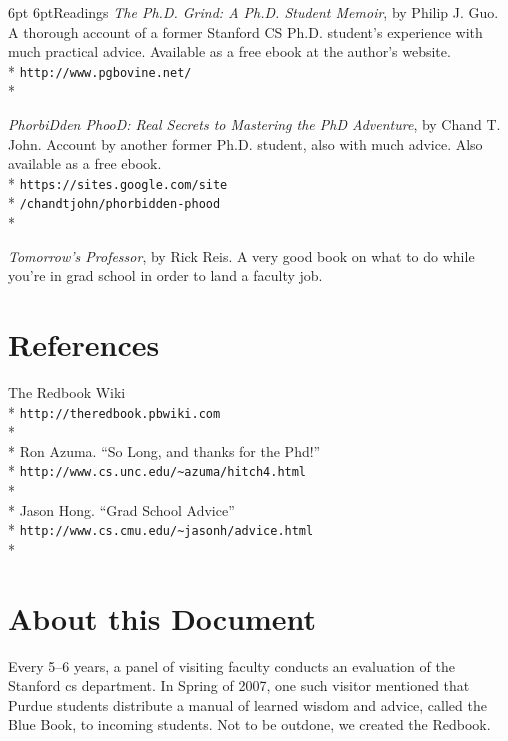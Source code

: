 \documentclass[10pt]{book}
\makeatletter
\renewcommand{\subsection}{\@startsection{subsection}{2}{0mm}%
   {6pt}%
   {6pt}{\normalfont\normalsize\itshape}}
\makeatother
\begin{document}
\subsection{Readings}
{\it The Ph.D. Grind: A Ph.D. Student Memoir}, by Philip J. Guo. A thorough account of a former Stanford CS Ph.D. student's experience with much practical advice. Available as a free ebook at the author's website.\\*
\verb+http://www.pgbovine.net/+\\*

{\it PhorbiDden PhooD: Real Secrets to Mastering the PhD Adventure}, by Chand T. John. Account by another former Ph.D. student, also with much advice. Also available as a free ebook.\\*
\verb+https://sites.google.com/site+\\*
\verb+/chandtjohn/phorbidden-phood+\\*

{\it Tomorrow's Professor}, by Rick Reis. A very good book on what to do while
you're in grad school in order to land a faculty job.

\chapter{References}
\vskip8pt
The Redbook Wiki\\*
\verb+http://theredbook.pbwiki.com+\\*
\\*
Ron Azuma. ``So Long, and thanks for the Phd!''\\*
\verb+http://www.cs.unc.edu/~azuma/hitch4.html+\\*
\\*
Jason Hong. ``Grad School Advice''\\*
\verb+http://www.cs.cmu.edu/~jasonh/advice.html+\\*



\chapter{About this Document}
\vskip8pt
Every 5--6 years, a panel of visiting faculty conducts an evaluation of the Stanford {\sc cs} department.
In Spring of 2007, one such visitor mentioned that Purdue students distribute a manual of learned wisdom and advice, called the Blue Book, to incoming students. Not to be outdone, we created the Redbook.

\vspace*{-5pt}
\end{document}
